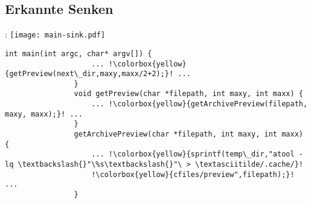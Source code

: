     \subsection{Erkannte Senken}
        \begin{frame}[fragile]{\secname: \subsecname}
            \texttt{[image: main-sink.pdf]}
            \begin{lstlisting}[gobble=16, escapechar=!]
                int main(int argc, char* argv[]) {
                    ... !\colorbox{yellow}{getPreview(next\_dir,maxy,maxx/2+2);}! ...
                }
                void getPreview(char *filepath, int maxy, int maxx) {
                    ... !\colorbox{yellow}{getArchivePreview(filepath, maxy, maxx);}! ...
                }
                getArchivePreview(char *filepath, int maxy, int maxx) {
                    ... !\colorbox{yellow}{sprintf(temp\_dir,"atool -lq \textbackslash{}"\%s\textbackslash{}"\ > \textasciitilde/.cache/}!
                    !\colorbox{yellow}{cfiles/preview",filepath);}! ...
                }
            \end{lstlisting}
        \end{frame}
